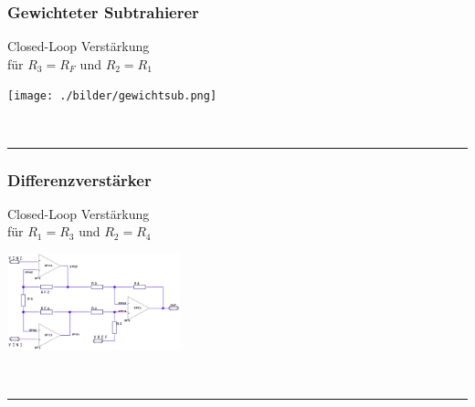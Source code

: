 		\subsubsection{Gewichteter Subtrahierer}
			\begin{minipage}[T]{13cm}
                Closed-Loop Verst\"arkung
                \hspace{3mm}\\
                f\"ur $R_3 = R_F$ und $R_2 = R_1$
                \hspace{0.1mm} 
            \end{minipage}
			\begin{minipage}{6cm}
            	\texttt{[image: ./bilder/gewichtsub.png]}
            \end{minipage}\\		
\hrule

		\subsubsection{Differenzverstärker}
            \begin{minipage}[T]{14cm}
                Closed-Loop Verst\"arkung
                \hspace{3mm}\\
                f\"ur $R_1 = R_3$ und $R_2 = R_4$
                \hspace{1mm} 
            \end{minipage}
            \begin{minipage}{5cm}
                \includegraphics[width=5cm]{./bilder/differenzver.png}
            \end{minipage}\\
\hrule
        
